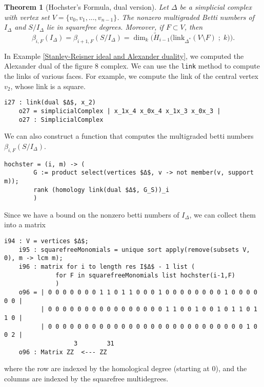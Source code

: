\documentclass[12pt,leqno]{amsart}
\newtheorem{theorem}[lemma]{Theorem}
\theoremstyle{definition}
\newenvironment{example}
{\pushQED{\qed}\renewcommand{\qedsymbol}{$\diamond$}\examplex}
{\popQED\endexamplex}
\begin{document}
%
\begin{theorem}[Hochster's Formula, dual version]
  Let $\Delta$ be a simplicial complex with vertex set $V = \{ v_0,v_1,...,v_{n-1} \}$. The nonzero multigraded Betti numbers of $I_\Delta$ and $S/I_\Delta$ lie in squarefree degrees. Moreover, if $F \subset V$, then
  \begin{displaymath}
    \beta_{i,F} (I_\Delta) = \beta_{i+1,F} (S/I_\Delta) = \dim_k\Big(\widetilde H_{i-1} \big( \mathrm{link}_{\Delta^*}(V \setminus F)\; ; \; k \big) \Big).
  \end{displaymath}
\end{theorem}
%
\begin{example}
  In Example \ref{Stanley-Reisner ideal and Alexander duality}, we computed the Alexander dual of the figure 8 complex. We can use the \texttt{link} method to compute the links of various faces. For example, we compute the link of the central vertex $v_2$, whose link is a square.
\begin{lstlisting}[basicstyle={\ttfamily \scriptsize}, xleftmargin=-23pt]
    i27 : link(dual $Δ$, x_2)
    o27 = simplicialComplex | x_1x_4 x_0x_4 x_1x_3 x_0x_3 |
    o27 : SimplicialComplex
\end{lstlisting}
  We can also construct a function that computes the multigraded betti numbers $\beta_{i,F}(S/I_\Delta)$.
\begin{lstlisting}[basicstyle={\ttfamily \scriptsize}, xleftmargin=-23pt]
    hochster = (i, m) -> (
        G := product select(vertices $Δ$, v -> not member(v, support m));
        rank (homology link(dual $Δ$, G_S))_i
        )
\end{lstlisting}
  Since we have a bound on the nonzero betti numbers of $I_\Delta$, we can collect them into a matrix
\begin{lstlisting}[basicstyle={\ttfamily \scriptsize}, xleftmargin=-23pt]
    i94 : V = vertices $Δ$;
    i95 : squarefreeMonomials = unique sort apply(remove(subsets V, 0), m -> lcm m);
    i96 : matrix for i to length res I$Δ$ - 1 list (
              for F in squarefreeMonomials list hochster(i-1,F)
              )
    o96 = | 0 0 0 0 0 0 0 1 1 0 1 1 0 0 0 1 0 0 0 0 0 0 0 0 1 0 0 0 0 0 0 |
          | 0 0 0 0 0 0 0 0 0 0 0 0 0 0 0 0 1 1 0 0 1 0 0 1 0 1 1 0 1 1 0 |
          | 0 0 0 0 0 0 0 0 0 0 0 0 0 0 0 0 0 0 0 0 0 0 0 0 0 0 0 1 0 0 2 |
                   3        31
    o96 : Matrix ZZ  <--- ZZ
\end{lstlisting}
  where the row are indexed by the homological degree (starting at $0$), and the columns are indexed by the squarefree multidegrees.
\end{example}
\end{document}
